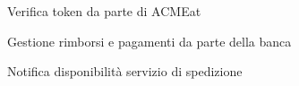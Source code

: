 \documentclass[11pt]{article} %
\begin{document}
\begin{figure}[!ht]
\begin{center}
\caption{Verifica token da parte di ACMEat}
\end{center}
\end{figure}

\begin{figure}[!ht]
\begin{center}
\caption{Gestione rimborsi e pagamenti da parte della banca}
\end{center}
\end{figure}

\begin{figure}[!ht]
\begin{center}
\caption{Notifica disponibilità servizio di spedizione}
\end{center}
\end{figure}
\end{document}

